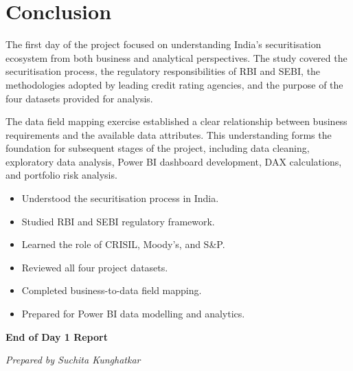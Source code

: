 
\section{Conclusion}

The first day of the project focused on understanding India's securitisation ecosystem from both business and analytical perspectives. The study covered the securitisation process, the regulatory responsibilities of RBI and SEBI, the methodologies adopted by leading credit rating agencies, and the purpose of the four datasets provided for analysis.

The data field mapping exercise established a clear relationship between business requirements and the available data attributes. This understanding forms the foundation for subsequent stages of the project, including data cleaning, exploratory data analysis, Power BI dashboard development, DAX calculations, and portfolio risk analysis.

\vspace{0.5cm}

\begin{tcolorbox}[colback=LightBlue,colframe=PrimaryBlue,title=Day 1 Learning Outcomes]
	
	\begin{itemize}
		
		\item Understood the securitisation process in India.
		
		\item Studied RBI and SEBI regulatory framework.
		
		\item Learned the role of CRISIL, Moody's, and S\&P.
		
		\item Reviewed all four project datasets.
		
		\item Completed business-to-data field mapping.
		
		\item Prepared for Power BI data modelling and analytics.
		
	\end{itemize}
	
\end{tcolorbox}

\vfill

\begin{center}
	
	\textbf{\Large End of Day 1 Report}
	
	\vspace{0.2cm}
	
	\textit{Prepared by Suchita Kunghatkar}
	
\end{center}